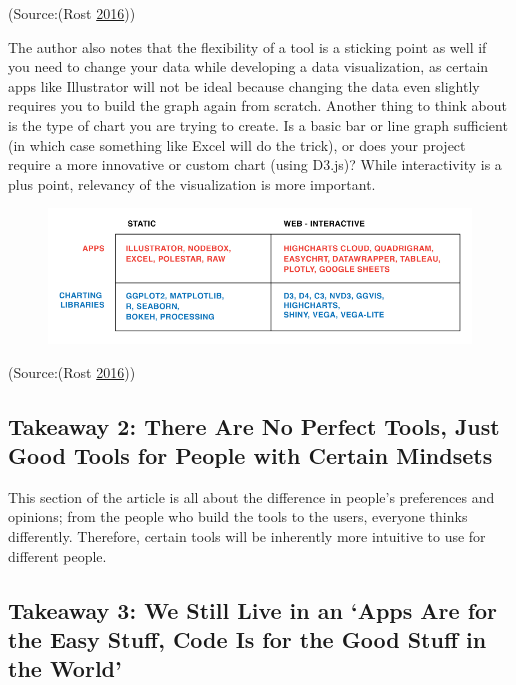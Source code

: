 \documentclass[]{book}
\begin{document}
(Source:(Rost \protect\hyperlink{ref-different_tools}{2016}))

The author also notes that the flexibility of a tool is a sticking point
as well if you need to change your data while developing a data
visualization, as certain apps like Illustrator will not be ideal
because changing the data even slightly requires you to build the graph
again from scratch. Another thing to think about is the type of chart
you are trying to create. Is a basic bar or line graph sufficient (in
which case something like Excel will do the trick), or does your project
require a more innovative or custom chart (using D3.js)? While
interactivity is a plus point, relevancy of the visualization is more
important.

\begin{figure}
\centering
\includegraphics{images/interactivity.png}
\caption{}
\end{figure}

(Source:(Rost \protect\hyperlink{ref-different_tools}{2016}))

\subsection{Takeaway 2: There Are No Perfect Tools, Just Good Tools for
People with Certain
Mindsets}\label{takeaway-2-there-are-no-perfect-tools-just-good-tools-for-people-with-certain-mindsets}

This section of the article is all about the difference in people's
preferences and opinions; from the people who build the tools to the
users, everyone thinks differently. Therefore, certain tools will be
inherently more intuitive to use for different people.

\subsection{\texorpdfstring{Takeaway 3: We Still Live in an `Apps Are
for the Easy Stuff, Code Is for the Good Stuff in the
World'}{Takeaway 3: We Still Live in an Apps Are for the Easy Stuff, Code Is for the Good Stuff in the World}}\label{takeaway-3-we-still-live-in-an-apps-are-for-the-easy-stuff-code-is-for-the-good-stuff-in-the-world}
\end{document}
